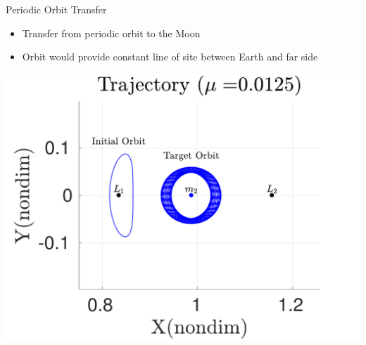 \begin{frame}{Periodic Orbit Transfer}
    \begin{itemize}
        \item Transfer from periodic orbit to the Moon
        \item Orbit would provide constant line of site between Earth and far side
    \end{itemize}
    \begin{center}
        \includegraphics[height=0.75\textheight,keepaspectratio]{figures/2017_JAS/moon_orbit.pdf} %
   \end{center}
\end{frame}

